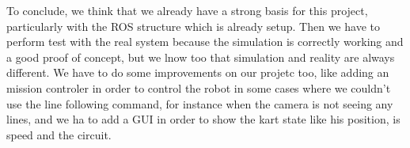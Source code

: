 To conclude, we think that we already have a strong basis for this project, particularly
with the ROS structure  which is already setup. Then we have to perform test with the
real system because the simulation is correctly working and a good proof of concept, 
but we lnow too that simulation and reality are always different. We have to do some
improvements on our projetc too, like adding an mission controler in order to control the
robot in some cases where we couldn't use the line following command, for instance when the 
camera is not seeing any lines, and we ha to add a GUI in order to show the kart state
like his position, is speed and the circuit.